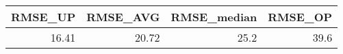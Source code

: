 \begin{tabular}{rrrr}
\toprule
 RMSE\_UP &  RMSE\_AVG &  RMSE\_median &  RMSE\_OP \\
\midrule
   16.41 &     20.72 &         25.2 &     39.6 \\
\bottomrule
\end{tabular}
